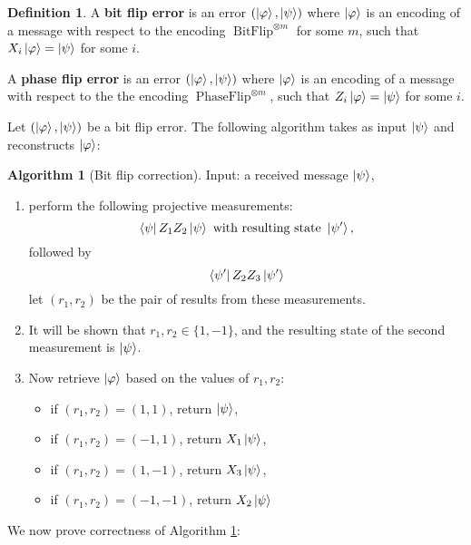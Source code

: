 \documentclass[12pt]{article}
\theoremstyle{plain}
\theoremstyle{definition}
\newtheorem{defn}[thm]{Definition} %
\newtheorem{algorithm}[thm]{Algorithm}
\begin{document}
\begin{defn}
	A \textbf{bit flip error} is an error $(\ket{\varphi},\ket{\psi})$ where $\ket{\varphi}$ is an encoding of a message with respect to the encoding $\operatorname{BitFlip}^{\otimes m}$ for some $m$, such that $X_i\ket{\varphi} =\ket{\psi}$ for some $i$.
	
	A \textbf{phase flip error} is an error  $(\ket{\varphi},\ket{\psi})$ where $\ket{\varphi}$ is an encoding of a message with respect to the the encoding $\operatorname{PhaseFlip}^{\otimes m}$, such that $Z_i\ket{\varphi} =\ket{\psi}$ for some $i$.
\end{defn}
Let $(\ket{\varphi},\ket{\psi})$ be a bit flip error.  The following algorithm takes as input $\ket{\psi}$ and reconstructs $\ket{\varphi}$:
\begin{algorithm}[Bit flip correction]\label{alg:bit_flip_correction}
	Input: a received message $\ket{\psi}$,
	\begin{enumerate}
		\item perform the following projective measurements:
		\begin{equation}
			\bra{\psi} Z_1 Z_2 \ket{\psi}\text{ with resulting state }\ket{\psi'},
		\end{equation}
		followed by
		\begin{equation}
			\bra{\psi'} Z_2 Z_3 \ket{\psi'}
		\end{equation}
		let $(r_1,r_2)$ be the pair of results from these measurements.
		\item It will be shown that $r_1,r_2 \in \lbrace 1,-1\rbrace$, and the resulting state of the second measurement is $\ket{\psi}$.
		\item Now retrieve $\ket{\varphi}$ based on the values of $r_1,r_2$:
		\begin{itemize}
			\item if $(r_1, r_2) = (1,1)$, return $\ket{\psi}$,
			\item if $(r_1,r_2) = (-1,1)$, return $X_1 \ket{\psi}$,
			\item if $(r_1,r_2) = (1,-1)$, return $X_3 \ket{\psi}$,
			\item if $(r_1,r_2) = (-1,-1)$, return $X_2 \ket{\psi}$
		\end{itemize}
	\end{enumerate}
\end{algorithm}
We now prove correctness of Algorithm \ref{alg:bit_flip_correction}:
\end{document}
